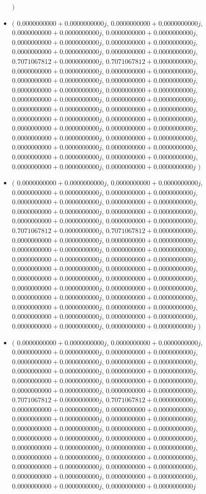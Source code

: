 \documentclass[14pt,a4paper]{article}
\begin{document}
\begin{itemize}
$\big)$
\item
$\big($
$0.0000000000+0.0000000000j$, $0.0000000000+0.0000000000j$, $0.0000000000+0.0000000000j$, $0.0000000000+0.0000000000j$, $0.0000000000+0.0000000000j$, $0.0000000000+0.0000000000j$, $0.0000000000+0.0000000000j$, $0.0000000000+0.0000000000j$, $0.7071067812+0.0000000000j$, $0.7071067812+0.0000000000j$, $0.0000000000+0.0000000000j$, $0.0000000000+0.0000000000j$, $0.0000000000+0.0000000000j$, $0.0000000000+0.0000000000j$, $0.0000000000+0.0000000000j$, $0.0000000000+0.0000000000j$, $0.0000000000+0.0000000000j$, $0.0000000000+0.0000000000j$, $0.0000000000+0.0000000000j$, $0.0000000000+0.0000000000j$, $0.0000000000+0.0000000000j$, $0.0000000000+0.0000000000j$, $0.0000000000+0.0000000000j$, $0.0000000000+0.0000000000j$, $0.0000000000+0.0000000000j$, $0.0000000000+0.0000000000j$, $0.0000000000+0.0000000000j$, $0.0000000000+0.0000000000j$, $0.0000000000+0.0000000000j$, $0.0000000000+0.0000000000j$, $0.0000000000+0.0000000000j$, $0.0000000000+0.0000000000j$
$\big)$
\item
$\big($
$0.0000000000+0.0000000000j$, $0.0000000000+0.0000000000j$, $0.0000000000+0.0000000000j$, $0.0000000000+0.0000000000j$, $0.0000000000+0.0000000000j$, $0.0000000000+0.0000000000j$, $0.0000000000+0.0000000000j$, $0.0000000000+0.0000000000j$, $0.0000000000+0.0000000000j$, $0.0000000000+0.0000000000j$, $0.7071067812+0.0000000000j$, $0.7071067812+0.0000000000j$, $0.0000000000+0.0000000000j$, $0.0000000000+0.0000000000j$, $0.0000000000+0.0000000000j$, $0.0000000000+0.0000000000j$, $0.0000000000+0.0000000000j$, $0.0000000000+0.0000000000j$, $0.0000000000+0.0000000000j$, $0.0000000000+0.0000000000j$, $0.0000000000+0.0000000000j$, $0.0000000000+0.0000000000j$, $0.0000000000+0.0000000000j$, $0.0000000000+0.0000000000j$, $0.0000000000+0.0000000000j$, $0.0000000000+0.0000000000j$, $0.0000000000+0.0000000000j$, $0.0000000000+0.0000000000j$, $0.0000000000+0.0000000000j$, $0.0000000000+0.0000000000j$, $0.0000000000+0.0000000000j$, $0.0000000000+0.0000000000j$
$\big)$
\item
$\big($
$0.0000000000+0.0000000000j$, $0.0000000000+0.0000000000j$, $0.0000000000+0.0000000000j$, $0.0000000000+0.0000000000j$, $0.0000000000+0.0000000000j$, $0.0000000000+0.0000000000j$, $0.0000000000+0.0000000000j$, $0.0000000000+0.0000000000j$, $0.0000000000+0.0000000000j$, $0.0000000000+0.0000000000j$, $0.0000000000+0.0000000000j$, $0.0000000000+0.0000000000j$, $0.7071067812+0.0000000000j$, $0.7071067812+0.0000000000j$, $0.0000000000+0.0000000000j$, $0.0000000000+0.0000000000j$, $0.0000000000+0.0000000000j$, $0.0000000000+0.0000000000j$, $0.0000000000+0.0000000000j$, $0.0000000000+0.0000000000j$, $0.0000000000+0.0000000000j$, $0.0000000000+0.0000000000j$, $0.0000000000+0.0000000000j$, $0.0000000000+0.0000000000j$, $0.0000000000+0.0000000000j$, $0.0000000000+0.0000000000j$, $0.0000000000+0.0000000000j$, $0.0000000000+0.0000000000j$, $0.0000000000+0.0000000000j$, $0.0000000000+0.0000000000j$, $0.0000000000+0.0000000000j$, $0.0000000000+0.0000000000j$

\end{itemize}
\end{document}
